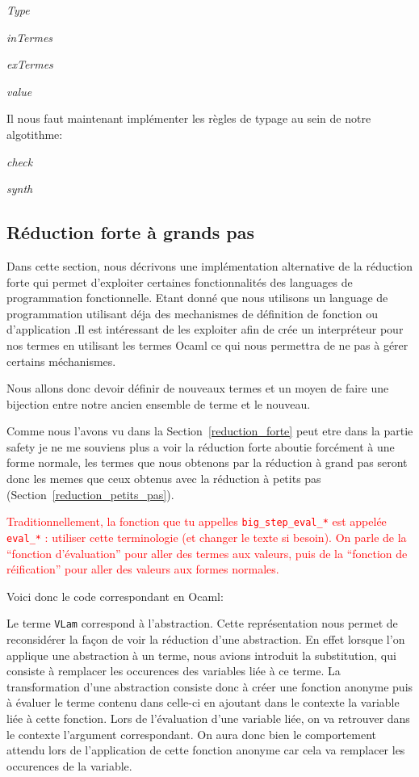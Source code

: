 \documentclass {article}
\newcommand{\codefrom}[3]
           {}
\theoremstyle{definition}
\theoremstyle{remark}
\newcommand{\todo}[1]{\textcolor{red}{#1}}
\newcommand{\fun}[1]{\lstinline!#1!}
\begin{document}
\emph{Type}
\codefrom{typed}{lambda}{type_pair}
\emph{inTermes}
\codefrom{typed}{lambda}{inTm_pair}
\emph{exTermes}
\codefrom{typed}{lambda}{exTm_pair}
\emph{value}
\codefrom{typed}{lambda}{value_pair}

Il nous faut maintenant implémenter les règles de typage au sein de notre algotithme:

\emph{check}
\codefrom{typed}{lambda}{check_pair}
\emph{synth}
\codefrom{typed}{lambda}{synth_pair}



\subsection{Réduction forte à grands pas}


Dans cette section, nous décrivons une implémentation alternative de
la réduction forte qui permet d'exploiter certaines fonctionnalités des languages de programmation fonctionnelle.
Etant donné que nous utilisons un language de programmation utilisant déja
des mechanismes de définition de fonction ou d'application .Il est
intéressant de les exploiter afin de crée un interpréteur pour nos termes
en utilisant les termes Ocaml ce qui nous permettra de ne pas à
gérer certains méchanismes.

Nous allons donc devoir définir de nouveaux termes et un moyen de
faire une bijection entre notre ancien ensemble de terme et le nouveau.

Comme nous l'avons vu dans la Section~\ref{reduction_forte}  peut
etre dans la partie safety je ne me souviens plus a voir \fi la
réduction forte aboutie forcément à une forme normale, les termes que
nous obtenons par la réduction à grand pas seront donc les memes que
ceux obtenus avec la réduction à petits pas
(Section~\ref{reduction_petits_pas}).

\todo{Traditionnellement, la fonction que tu appelles
  \lstinline!big_step_eval_*! est appelée \lstinline!eval_*! :
  utiliser cette terminologie (et changer le texte si besoin). On
  parle de la ``fonction d'évaluation'' pour aller des termes aux
  valeurs, puis de la ``fonction de réification'' pour aller des
  valeurs aux formes normales.}

\newcommand{\VLam}{\lstinline!VLam!}
Voici donc le code correspondant en Ocaml:

\codefrom{typed}{lambda}{value}
\codefrom{typed}{lambda}{neutral}

Le terme \fun{VLam} correspond à l'abstraction.
Cette représentation nous permet de reconsidérer la façon de voir la 
réduction d'une abstraction. En effet lorsque l'on applique une abstraction
à un terme, nous avions introduit la substitution, qui consiste à remplacer les occurences 
des variables liée à ce terme. La transformation d'une abstraction consiste donc à 
créer une fonction anonyme puis à évaluer le terme contenu dans celle-ci en ajoutant dans le 
contexte la variable liée à cette fonction. Lors de l'évaluation d'une variable liée, on va
retrouver dans le contexte l'argument correspondant. On aura donc bien le comportement attendu
lors de l'application de cette fonction anonyme car cela va remplacer les occurences de la 
variable.
\end{document}

